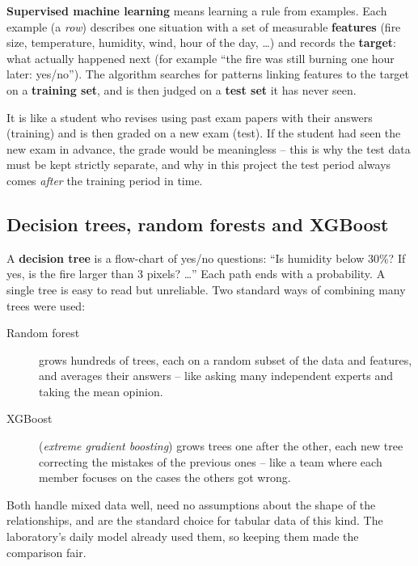 \documentclass[11pt,a4paper,oneside]{report}
\begin{document}
\textbf{Supervised machine learning} means learning a rule from examples. Each
example (a \emph{row}) describes one situation with a set of measurable
\textbf{features} (fire size, temperature, humidity, wind, hour of the day,
\dots) and records the \textbf{target}: what actually happened next (for example
\enquote{the fire was still burning one hour later: yes/no}). The algorithm
searches for patterns linking features to the target on a \textbf{training set},
and is then judged on a \textbf{test set} it has never seen.

\begin{plainbox}
It is like a student who revises using past exam papers with their answers
(training) and is then graded on a new exam (test). If the student had seen the
new exam in advance, the grade would be meaningless -- this is why the test data
must be kept strictly separate, and why in this project the test period always
comes \emph{after} the training period in time.
\end{plainbox}

\subsection{Decision trees, random forests and XGBoost}

A \textbf{decision tree} is a flow-chart of yes/no questions: \enquote{Is
humidity below 30\%? If yes, is the fire larger than 3 pixels? \dots} Each path
ends with a probability. A single tree is easy to read but unreliable. Two
standard ways of combining many trees were used:

\begin{description}
  \item[Random forest] grows hundreds of trees, each on a random subset of the
        data and features, and averages their answers -- like asking many
        independent experts and taking the mean opinion.
  \item[XGBoost] (\emph{extreme gradient boosting}) grows trees one after the
        other, each new tree correcting the mistakes of the previous ones -- like
        a team where each member focuses on the cases the others got wrong.
\end{description}

Both handle mixed data well, need no assumptions about the shape of the
relationships, and are the standard choice for tabular data of this kind. The
laboratory's daily model already used them, so keeping them made the comparison
fair.
\end{document}
